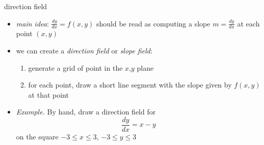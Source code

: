 \documentclass{beamer}
\begin{document}
\begin{frame}{direction field}

\begin{itemize}
\item \emph{main idea}: $\frac{dy}{dx} = f(x,y)$ should be read as computing a slope $m=\frac{dy}{dx}$ at each point $(x,y)$

\bigskip
\item we can create a \emph{direction field} or \emph{slope field}:
    \begin{enumerate}
    \item generate a grid of point in the $x$,$y$ plane
    \item for each point, draw a short line segment with the slope given by $f(x,y)$ at that point
    \end{enumerate}

\bigskip
\item \begin{minipage}[t]{0.39\textwidth}
\emph{Example.}  By hand, draw a direction field for
$$\frac{dy}{dx} = x-y$$
on the square $-3 \le x \le 3$, $-3 \le y \le 3$
\end{minipage} 

\vspace{20mm}
\end{itemize}
\end{frame}
\end{document}
